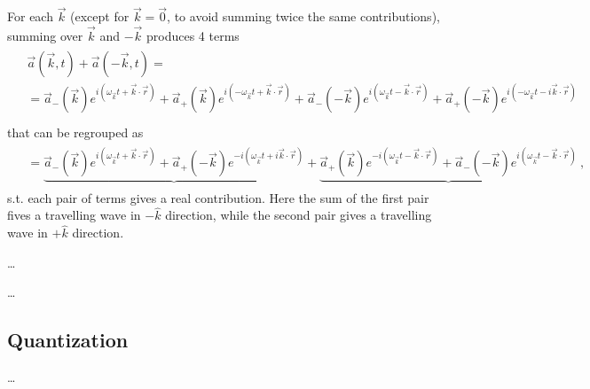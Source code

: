 \documentclass[letterpaper,10pt,english]{jupyterBook}
\begin{document}
\sphinxAtStartPar
For each \(\vec{k}\) (except for \(\vec{k} = \vec{0}\), to avoid summing twice the same contributions), summing over \(\vec{k}\) and \(-\vec{k}\) produces 4 terms
\begin{equation*}
\begin{split}\begin{aligned}
  & \vec{a}(\vec{k}, t) + \vec{a}(-\vec{k}, t) = \\
  & = \vec{a}_{-}(\vec{k}) e^{i ( \omega_{\vec{k}} t + \vec{k} \cdot \vec{r})} + \vec{a}_{+}(\vec{k}) e^{i( - \omega_{\vec{k}} t + \vec{k} \cdot \vec{r})} 
    +  \vec{a}_{-}(-\vec{k}) e^{i ( \omega_{\vec{k}} t - \vec{k} \cdot \vec{r})} + \vec{a}_{+}(-\vec{k}) e^{i(- \omega_{\vec{k}} t -i \vec{k} \cdot \vec{r})} \\ 
\end{aligned}\end{split}
\end{equation*}
\sphinxAtStartPar
that can be re\sphinxhyphen{}grouped as
\begin{equation*}
\begin{split}\begin{aligned}
  & = \underbrace{ \vec{a}_{-}(\vec{k}) e^{i ( \omega_{\vec{k}} t + \vec{k} \cdot \vec{r})} + \vec{a}_{+}(-\vec{k}) e^{-i(\omega_{\vec{k}} t + i \vec{k} \cdot \vec{r})} }
   + \underbrace{ \vec{a}_{+}(\vec{k}) e^{-i(\omega_{\vec{k}} t - \vec{k} \cdot \vec{r})} + \vec{a}_{-}(-\vec{k}) e^{i ( \omega_{\vec{k}} t - \vec{k} \cdot \vec{r})} } \ ,
\end{aligned}\end{split}
\end{equation*}
\sphinxAtStartPar
s.t. each pair of terms gives a real contribution. Here the sum of the first pair fives a travelling wave in \(- \hat{k}\) direction, while the second pair gives a travelling wave in \(+ \hat{k}\) direction.

\sphinxAtStartPar
{}

\sphinxAtStartPar
…

\sphinxAtStartPar
{}

\sphinxAtStartPar
…


\subsection{Quantization}
\label{\detokenize{ch/quantum-mechanics/qft/photons-coulomb:quantization}}\label{\detokenize{ch/quantum-mechanics/qft/photons-coulomb:quantum-mechanics-qft-photons-coulomb-quantization}}
\sphinxAtStartPar
… 
\end{document}
